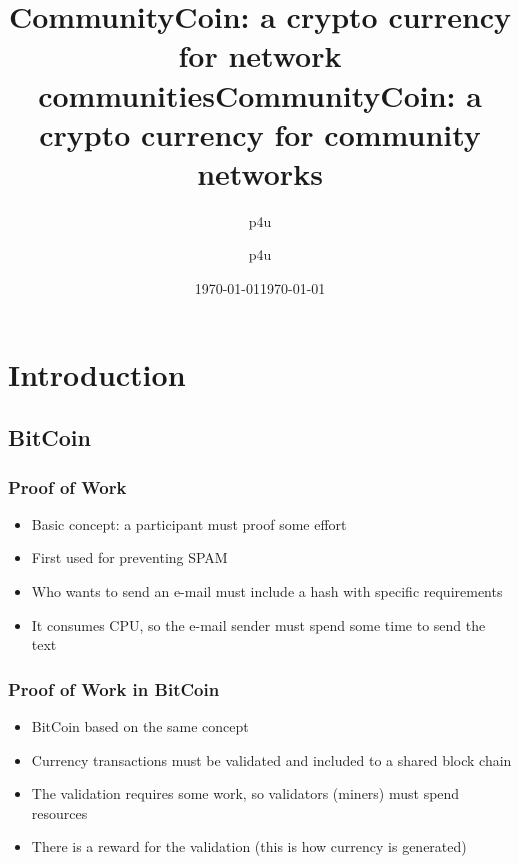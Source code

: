 \documentclass[usepdftitle=false,13pt]{beamer}
\title[CommunityCoin: a crypto currency for network communities]{CommunityCoin: a crypto currency for network communities}
\author[{p4u}]{p4u}
\institute[{guifi.net}]{guifi.net}
\date[\today]{\today}
\begin{document}
\title[CommunityCoin\hspace{20em}\insertframenumber/\inserttotalframenumber]{CommunityCoin: a crypto currency for community networks}  
\author[p4u]{ p4u\\
 }

\date{\today} 

\frame{\titlepage}




\section{Introduction}
\subsection{BitCoin}



\begin{frame}\frametitle{Proof of Work}
	\begin{itemize}
		\item Basic concept: a participant must proof some effort
		
		\item First used for preventing SPAM 
		
		\item Who wants to send an e-mail must include a hash with specific requirements
	
		\item It consumes CPU, so the e-mail sender must spend some time to send the text
	\end{itemize}
\end{frame}

\begin{frame}\frametitle{Proof of Work in BitCoin}
	\begin{itemize}
		\item BitCoin based on the same concept
		\item Currency transactions must be validated and included to a shared block chain
		\item The validation requires some work, so validators (miners) must spend resources
		\item There is a reward for the validation (this is how currency is generated)
	\end{itemize}
\end{frame}
\end{document}
